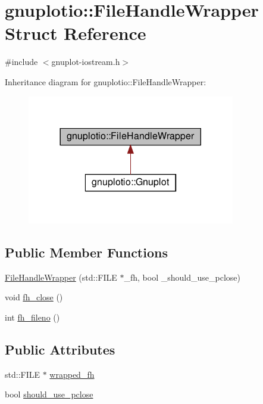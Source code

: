 \hypertarget{structgnuplotio_1_1_file_handle_wrapper}{}\section{gnuplotio\+:\+:File\+Handle\+Wrapper Struct Reference}
\label{structgnuplotio_1_1_file_handle_wrapper}


{\ttfamily \#include $<$gnuplot-\/iostream.\+h$>$}



Inheritance diagram for gnuplotio\+:\+:File\+Handle\+Wrapper\+:
\nopagebreak
\begin{figure}[H]
\begin{center}
\leavevmode
\includegraphics[width=257pt]{structgnuplotio_1_1_file_handle_wrapper__inherit__graph}
\end{center}
\end{figure}
\subsection*{Public Member Functions}
\begin{DoxyCompactItemize}
\item 
\hyperlink{structgnuplotio_1_1_file_handle_wrapper_a26b2378e193a9c41be5aed97e11f9411}{File\+Handle\+Wrapper} (std\+::\+F\+I\+LE $\ast$\+\_\+fh, bool \+\_\+should\+\_\+use\+\_\+pclose)
\item 
void \hyperlink{structgnuplotio_1_1_file_handle_wrapper_acafac45efd9c78ce621af4f3228c6f67}{fh\+\_\+close} ()
\item 
int \hyperlink{structgnuplotio_1_1_file_handle_wrapper_a3202ccd15d624f26dd2cf699d3456de6}{fh\+\_\+fileno} ()
\end{DoxyCompactItemize}
\subsection*{Public Attributes}
\begin{DoxyCompactItemize}
\item 
std\+::\+F\+I\+LE $\ast$ \hyperlink{structgnuplotio_1_1_file_handle_wrapper_adcb58bfcd9dbdba000a7e7395bee2ef9}{wrapped\+\_\+fh}
\item 
bool \hyperlink{structgnuplotio_1_1_file_handle_wrapper_a11b63ed64cf53167e26c5273778d90ea}{should\+\_\+use\+\_\+pclose}
\end{DoxyCompactItemize}


